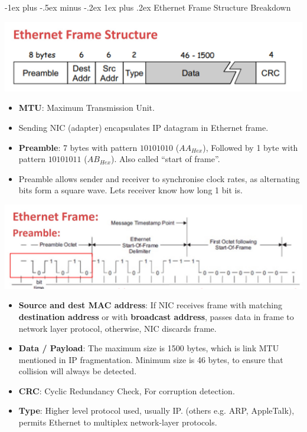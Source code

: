 \documentclass[12pt, landscape]{article}
\makeatletter
\renewcommand{\subsubsection}{\@startsection{subsubsection}{3}{0.1mm}%
                                {-1ex plus -.5ex minus -.2ex}%
                                {1ex plus .2ex}%
                                {\normalfont\small\bfseries}}
\makeatother
\begin{document}
\begin{multicols*}{3}
\subsubsection{Ethernet Frame Structure Breakdown}
\centerline{\includegraphics[width=1\linewidth]{ethernetframe}}
\begin{itemize}
\item \textbf{MTU}: Maximum Transmission Unit.
\item Sending NIC (adapter) encapsulates IP datagram in Ethernet frame.
\item \textbf{Preamble}:  7 bytes with pattern $10101010$ ($AA_{Hex}$), Followed by 1 byte with pattern $10101011$ ($AB_{Hex}$). Also called “start of frame”. 
\item Preamble allows sender and receiver to synchronise clock rates, as alternating bits form a square wave. Lets receiver know how long 1 bit is.
\end{itemize}
\smallskip
\centerline{\includegraphics[width=1\linewidth]{preamble}}
\begin{itemize}
\item \textbf{Source and dest MAC address}: If NIC receives frame with matching \textbf{destination address} or with \textbf{broadcast address}, passes data in frame to network layer protocol, otherwise, NIC discards frame.
\item \textbf{Data / Payload}: The maximum size is 1500 bytes, which is link MTU mentioned in IP fragmentation. Minimum size is 46 bytes, to ensure that collision will always be detected. 
\item \textbf{CRC}: Cyclic Redundancy Check, For corruption detection.
\item \textbf{Type}: Higher level protocol used, usually IP. (others e.g. ARP, AppleTalk), permits Ethernet to multiplex network-layer protocols.
\end{itemize}


\end{multicols*}
\end{document}
